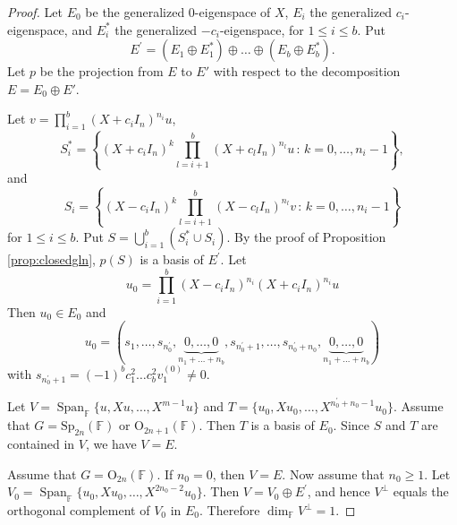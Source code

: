 \documentclass[12pt]{amsart}
\theoremstyle{definition}
\theoremstyle{remark}\newtheorem{rmk}[lm]{Remark}
\newcommand{\RO}{{\mathrm {O}}}
\newcommand{\Sp}{{\mathrm{Sp}}}
\newcommand{\Span}{\operatorname{Span}}
\newcommand{\C}{\mathbb{F}}
\renewcommand{\mid}{\,:\,}
\begin{document}
	\begin{proof}
		Let $E_0$ be the generalized 0-eigenspace of $X$, $E_i$ the generalized $c_i$-eigenspace, and $E_i^*$ the generalized $-c_i$-eigenspace, for $1\leq i\leq b$. Put
		\begin{equation*}
			E^{\prime}=(E_1\oplus E_1^*)\oplus\dots\oplus(E_b\oplus E_b^*).
		\end{equation*}
		Let $p$ be the projection from $E$ to $E'$ with respect to the decomposition $E=E_0\oplus E'$.
		
		Let $v=\prod_{i=1}^{b}(X+c_iI_n)^{n_i}u$,
		\begin{equation*}
			S_i^*=\left\{(X+c_iI_n)^k\prod_{l=i+1}^{b}(X+c_lI_n)^{n_l}u\mid k=0,\dots,n_i-1\right\},
		\end{equation*}
		and
		\begin{equation*}
			S_i=\left\{(X-c_iI_n)^k\prod_{l=i+1}^{b}(X-c_lI_n)^{n_l}v\mid k=0,\dots,n_i-1\right\}
		\end{equation*}
		for $1\leq i\leq b$. Put $S=\bigcup_{i=1}^b(S_i^*\cup S_i)$. By the proof of Proposition \ref{prop:closedgln}, $p(S)$ is a basis of $E^{\prime}$. Let
		\begin{equation*}
			u_0=\prod_{i=1}^b(X-c_iI_n)^{n_i}(X+c_iI_n)^{n_i}u
		\end{equation*}
		Then $u_0\in E_0$ and
		\begin{equation*}
			u_0=(s_1,\dots,s_{n_0^{\prime}},\underbrace{0,\dots,0}_{n_1+\dots+n_b},s_{n_0^{\prime}+1},\dots,s_{n_0^{\prime}+n_0},\underbrace{0,\dots,0}_{n_1+\dots+n_b})
		\end{equation*}
		with $s_{n_0^{\prime}+1}=(-1)^bc_1^2\dots c_b^2v_1^{(0)}\neq 0$.
		
		Let $V=\Span_{\C}\{u,Xu,\dots,X^{m-1}u\}$ and $T=\{u_0,Xu_0,\dots,X^{n_0^{\prime}+n_0-1}u_0\}$. Assume that $G=\Sp_{2n}(\C)$ or $\RO_{2n+1}(\C)$. Then $T$ is a basis of $E_0$. Since $S$ and $T$ are contained in $V$, we have $V=E$.
		
		Assume that $G=\RO_{2n}(\C)$. If $n_0=0$, then $V=E$. Now assume that $n_0\geq 1$. Let $V_0=\Span_{\C}\{u_0,Xu_0,\dots,X^{2n_0-2}u_0\}$. Then $V=V_0\oplus E^{\prime}$, and hence $V^{\bot}$ equals the orthogonal complement of $V_0$ in $E_0$. Therefore $\dim_{\C}V^{\bot}=1$.
	\end{proof}
\end{document}
